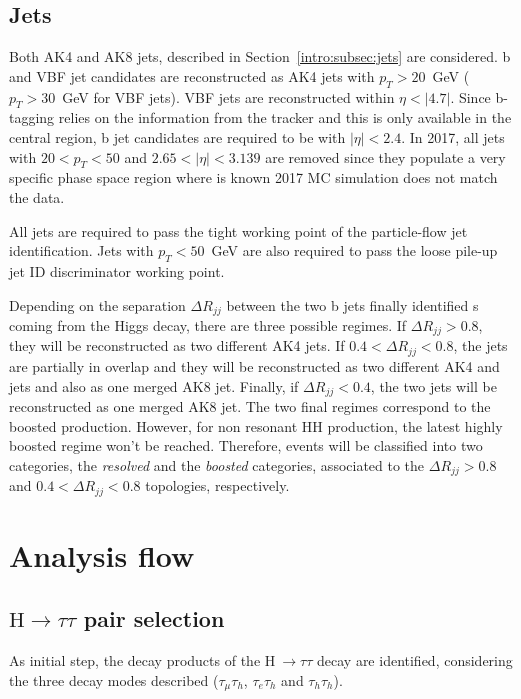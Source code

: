 \documentclass[../main.tex]{subfiles}
\begin{document}
\subsection{Jets}
\label{hh:subsec:jets}

Both AK4 and AK8 jets, described in Section~\ref{intro:subsec:jets} are considered. b and VBF jet candidates are reconstructed as AK4 jets with $p_T>20$~GeV ($p_T>30$~GeV for VBF jets). VBF jets are reconstructed within $\eta<|4.7|$. Since b-tagging relies on the information from the tracker and this is only available in the central region, b jet candidates are required to be with $|\eta|<2.4$. In 2017, all jets with $20<p_T<50$ and $2.65<|\eta|<3.139$ are removed since they populate a very specific phase space region where is known 2017 MC simulation does not match the data.

All jets are required to pass the tight working point of the particle-flow jet identification. Jets with $p_T<50$~GeV are also required to pass the loose pile-up jet ID discriminator working point.

Depending on the separation $\Delta R_{jj}$ between the two b jets finally identified s coming from the Higgs decay, there are three possible regimes. If $\Delta R_{jj} > 0.8$, they will be reconstructed as two different AK4 jets. If $0.4 < \Delta R_{jj} < 0.8$, the jets are partially in overlap and they will be reconstructed as two different AK4 and jets and also as one merged AK8 jet. Finally, if $\Delta R_{jj} < 0.4$, the two jets will be reconstructed as one merged AK8 jet. The two final regimes correspond to the boosted production. However, for non resonant HH production, the latest highly boosted regime won't be reached. Therefore, events will be classified into two categories, the \textit{resolved} and the \textit{boosted} categories, associated to the $\Delta R_{jj} > 0.8$ and $0.4 < \Delta R_{jj} < 0.8$ topologies, respectively.



\section{Analysis flow}
\label{hh:sec:analysis_flow}

\subsection{$\text{H}\to\tau\tau$ pair selection}

As initial step, the decay products of the H$~\to\tau\tau$ decay are identified, considering the three decay modes described ($\tau_\mu\tau_h$, $\tau_e\tau_h$ and $\tau_h\tau_h$). 
\end{document}
